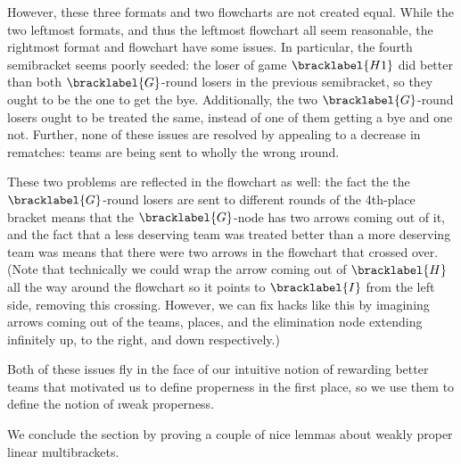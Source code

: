 {    


    However, these three formats and two flowcharts are not created equal. While the two leftmost formats, and thus the leftmost flowchart all seem reasonable, the rightmost format and flowchart have some issues. In particular, the fourth semibracket seems poorly seeded: the loser of game $\bracklabel{H1}$ did better than both $\bracklabel{G}$-round losers in the previous semibracket, so they ought to be the one to get the bye. Additionally, the two $\bracklabel{G}$-round losers ought to be treated the same, instead of one of them getting a bye and one not. Further, none of these issues are resolved by appealing to a decrease in rematches: teams are being sent to wholly the wrong \i{round}.

    These two problems are reflected in the flowchart as well: the fact the the $\bracklabel{G}$-round losers are sent to different rounds of the 4th-place bracket means that the $\bracklabel{G}$-node has two arrows coming out of it, and the fact that a less deserving team was treated better than a more deserving team was means that there were two arrows in the flowchart that crossed over. (Note that technically we could wrap the arrow coming out of $\bracklabel{H}$ all the way around the flowchart so it points to $\bracklabel{I}$ from the left side, removing this crossing. However, we can fix hacks like this by imagining arrows coming out of the teams, places, and the elimination node extending infinitely up, to the right, and down respectively.)

    Both of these issues fly in the face of our intuitive notion of rewarding better teams that motivated us to define properness in the first place, so we use them to define the notion of \i{weak properness}.


    We conclude the section by proving a couple of nice lemmas about weakly proper linear multibrackets.


}
